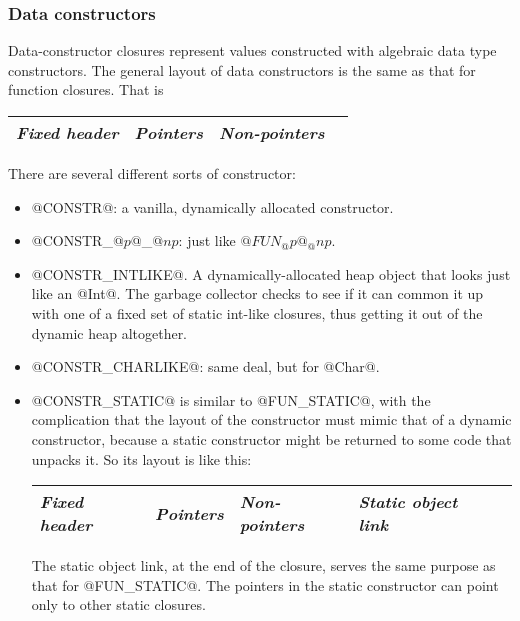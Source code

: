 \documentclass[11pt]{article}
\newcommand{\Subsubsection}[2]{\subsubsection{#1}\label{sec:#2}}
\begin{document}
\Subsubsection{Data constructors}{CONSTR}

Data-constructor closures represent values constructed with algebraic
data type constructors.  The general layout of data constructors is
the same as that for function closures.  That is

\begin{center}
\begin{tabular}{|l|l|l|l|}\hline
\emph{Fixed header}  & \emph{Pointers} & \emph{Non-pointers} \\ \hline
\end{tabular}
\end{center}

There are several different sorts of constructor:

\begin{itemize}

\item @CONSTR@: a vanilla, dynamically allocated constructor.

\item @CONSTR_@$p$@_@$np$: just like $@FUN_@p@_@np$.

\item @CONSTR_INTLIKE@.  A dynamically-allocated heap object that
looks just like an @Int@.  The garbage collector checks to see if it
can common it up with one of a fixed set of static int-like closures,
thus getting it out of the dynamic heap altogether.

\item @CONSTR_CHARLIKE@:  same deal, but for @Char@.

\item @CONSTR_STATIC@ is similar to @FUN_STATIC@, with the
complication that the layout of the constructor must mimic that of a
dynamic constructor, because a static constructor might be returned to
some code that unpacks it.  So its layout is like this:

\begin{center}
\begin{tabular}{|l|l|l|l|l|}\hline
\emph{Fixed header}  & \emph{Pointers} & \emph{Non-pointers} & \emph{Static object link}\\ \hline
\end{tabular}
\end{center}

The static object link, at the end of the closure, serves the same purpose
as that for @FUN_STATIC@.  The pointers in the static constructor can point
only to other static closures.


\end{itemize}
\end{document}
